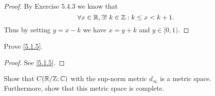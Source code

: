 \begin{proof}
  By Exercise 5.4.3 we know that
  \[
    \forall x \in \mathbb{R}, \exists!\ k \in \mathbb{Z} : k \leq x < k + 1.
  \]
  Thus by setting \(y = x - k\) we have \(x = y + k\) and \(y \in [0, 1)\).
\end{proof}

\begin{ex}\label{ex:5.1.2}
  Prove \cref{5.1.5}.
\end{ex}

\begin{proof}
  See \cref{5.1.5}.
\end{proof}

\begin{ex}\label{ex:5.1.3}
  Show that \(C(\mathbb{R} / \mathbb{Z} ; \mathbb{C})\) with the sup-norm metric \(d_\infty\) is a metric space.
  Furthermore, show that this metric space is complete.
\end{ex}

